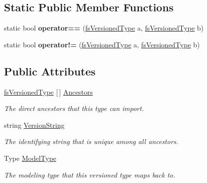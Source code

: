 \subsection*{Static Public Member Functions}
\begin{DoxyCompactItemize}
\item 
\mbox{\label{struct_full_serializer_1_1_internal_1_1fs_versioned_type_adca4814331ac9692e9e275a0f800343b}} 
static bool {\bfseries operator==} (\hyperlink{struct_full_serializer_1_1_internal_1_1fs_versioned_type}{fs\+Versioned\+Type} a, \hyperlink{struct_full_serializer_1_1_internal_1_1fs_versioned_type}{fs\+Versioned\+Type} b)
\item 
\mbox{\label{struct_full_serializer_1_1_internal_1_1fs_versioned_type_a2ed1972bbf8e0181d549dc5c258549d1}} 
static bool {\bfseries operator!=} (\hyperlink{struct_full_serializer_1_1_internal_1_1fs_versioned_type}{fs\+Versioned\+Type} a, \hyperlink{struct_full_serializer_1_1_internal_1_1fs_versioned_type}{fs\+Versioned\+Type} b)
\end{DoxyCompactItemize}
\subsection*{Public Attributes}
\begin{DoxyCompactItemize}
\item 
\hyperlink{struct_full_serializer_1_1_internal_1_1fs_versioned_type}{fs\+Versioned\+Type} \mbox{[}$\,$\mbox{]} \hyperlink{struct_full_serializer_1_1_internal_1_1fs_versioned_type_a39df96581297b4b9d9fbadfdeeaea33d}{Ancestors}
\begin{DoxyCompactList}\small\item\em The direct ancestors that this type can import. \end{DoxyCompactList}\item 
string \hyperlink{struct_full_serializer_1_1_internal_1_1fs_versioned_type_a979556013923bbb22b6ffe86840fca79}{Version\+String}
\begin{DoxyCompactList}\small\item\em The identifying string that is unique among all ancestors. \end{DoxyCompactList}\item 
Type \hyperlink{struct_full_serializer_1_1_internal_1_1fs_versioned_type_a7b9f9eb4f88ca3f145174415e92dc3f2}{Model\+Type}
\begin{DoxyCompactList}\small\item\em The modeling type that this versioned type maps back to. \end{DoxyCompactList}\end{DoxyCompactItemize}


